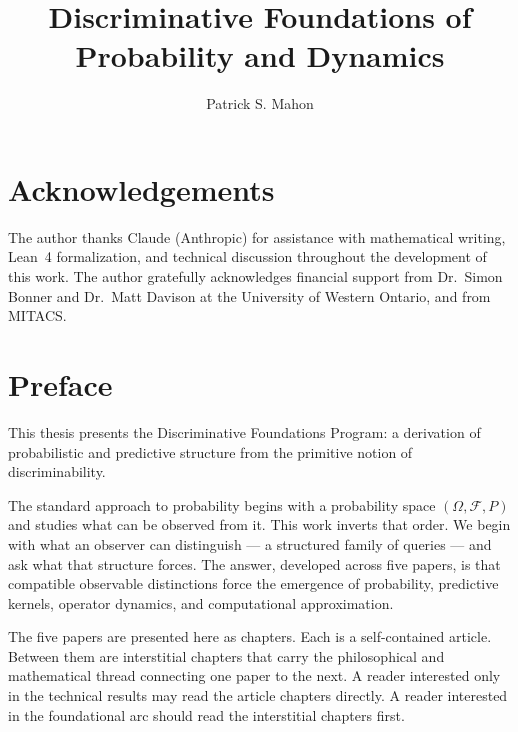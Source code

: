 \documentclass[12pt, oneside]{book}
\title{Discriminative Foundations of Probability and Dynamics}
\author{Patrick S. Mahon}
\date{}
\theoremstyle{definition}
\theoremstyle{remark}
\begin{document}
\frontmatter

\maketitle

\tableofcontents

\chapter*{Acknowledgements}

The author thanks Claude (Anthropic) for assistance with mathematical writing,
Lean~4 formalization, and technical discussion throughout the development of this
work.  The author gratefully acknowledges financial support from Dr.\ Simon Bonner
and Dr.\ Matt Davison at the University of Western Ontario, and from MITACS.

\chapter*{Preface}

This thesis presents the Discriminative Foundations Program: a derivation of
probabilistic and predictive structure from the primitive notion of
discriminability.

The standard approach to probability begins with a probability space
$(\Omega, \mathcal{F}, P)$ and studies what can be observed from it.
This work inverts that order.  We begin with what an observer can
distinguish --- a structured family of queries --- and ask what that
structure forces.  The answer, developed across five papers, is that
compatible observable distinctions force the emergence of probability,
predictive kernels, operator dynamics, and computational approximation.

The five papers are presented here as chapters.  Each is a
self-contained article.  Between them are interstitial chapters that
carry the philosophical and mathematical thread connecting one paper
to the next.  A reader interested only in the technical results may
read the article chapters directly.  A reader interested in the
foundational arc should read the interstitial chapters first.
\end{document}

